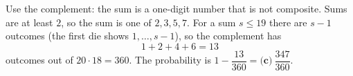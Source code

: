 Use the complement: the sum is a one-digit number that is not composite. Sums are at least $2$, so the sum is one of $2,3,5,7$. For a sum $s\le19$ there are $s-1$ outcomes (the first die shows $1,\dots,s-1$), so the complement has
\[
1+2+4+6=13
\]
outcomes out of $20\cdot18=360$. The probability is $1-\dfrac{13}{360}=\boxed{\textbf{(c)}\ \dfrac{347}{360}}$.

